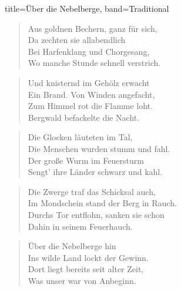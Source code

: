 \begin{song}{title=Über die Nebelberge, band=Traditional}
\begin{multicols}{2}
        \begin{verse}
            Aus goldnen Bechern, ganz für sich, \\
            Da zechten sie allabendlich \\
            Bei Harfenklang und Chorgesang, \\
            Wo manche Stunde schnell verstrich. \\
        \end{verse}

        \begin{verse}
            Und knisternd im Gehölz erwacht \\
            Ein Brand. Von Winden angefacht, \\
            Zum Himmel rot die Flamme loht. \\
            Bergwald befackelte die Nacht. \\
        \end{verse}

        \begin{verse}
            Die Glocken läuteten im Tal, \\
            Die Menschen wurden stumm und fahl. \\
            Der große Wurm im Feuersturm \\
            Sengt’ ihre Länder schwarz und kahl. \\
        \end{verse}

        \begin{verse}
            Die Zwerge traf das Schicksal auch, \\
            Im Mondschein stand der Berg in Rauch. \\
            Durchs Tor entflohn, sanken sie schon \\
            Dahin in seinem Feuerhauch. \\
        \end{verse}

        \begin{verse}
            Über die Nebelberge hin \\
            Ins wilde Land lockt der Gewinn. \\
            Dort liegt bereits seit alter Zeit, \\
            Was unser war von Anbeginn. \\
        \end{verse}
    \end{multicols}
\end{song}